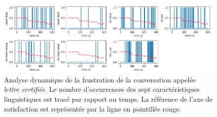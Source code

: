 \begin{figure}
    \centering
    \includegraphics[width=\textwidth]{./Chapitre7/figures/ex_dynamic.png}
    \caption{Analyse dynamique de la frustration de la conversation appelée \textit{lettre certifiée}. Le nombre d'occurrences des sept caractéristiques linguistiques est tracé par rapport au temps. La référence de l'axe de satisfaction est représentée par la ligne en pointillée rouge.}
    \label{fig:ex_dynamic}
\end{figure}
